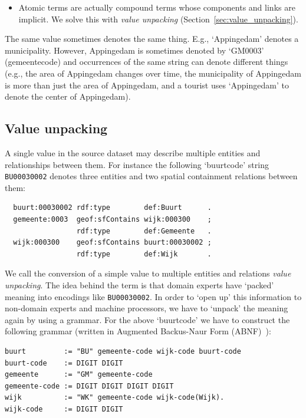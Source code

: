\documentclass[a4paper]{scrartcl}
\newcommand{\textt}[1]{{\small \texttt{#1}}}
\begin{document}
\begin{itemize}
  \item Atomic terms are actually compound terms whose components and
    links are implicit.  We solve this with \emph{value unpacking}
    (Section~\ref{sec:value_unpacking}).
\end{itemize}

The same value sometimes denotes the same thing.  E.g., `Appingedam'
denotes a municipality.  However, Appingedam is sometimes denoted by
`GM0003' (gemeentecode) and occurrences of the same string can denote
different things (e.g., the area of Appingedam changes over time, the
municipality of Appingedam is more than just the area of Appingedam,
and a tourist uses `Appingedam' to denote the center of Appingedam).



\subsection{Value unpacking}
\label{sec:grammar}
\label{sec:value_unpacking}

A single value in the source dataset may describe multiple entities
and relationships between them.  For instance the following
`buurtcode' string \textt{BU00030002} denotes three entities and two
spatial containment relations between them:

\begin{verbatim}
  buurt:00030002 rdf:type        def:Buurt      .
  gemeente:0003  geof:sfContains wijk:000300    ;
                 rdf:type        def:Gemeente   .
  wijk:000300    geof:sfContains buurt:00030002 ;
                 rdf:type        def:Wijk       .
\end{verbatim}

We call the conversion of a simple value to multiple entities and
relations \emph{value unpacking}.  The idea behind the term is that
domain experts have `packed' meaning into encodings like
\texttt{BU00030002}.  In order to `open up' this information to
non-domain experts and machine processors, we have to `unpack' the
meaning again by using a grammar.  For the above `buurtcode' we have
to construct the following grammar (written in Augmented Backus-Naur
Form (ABNF)~\cite{Crocker2008}):

\begin{verbatim}
buurt         := "BU" gemeente-code wijk-code buurt-code
buurt-code    := DIGIT DIGIT
gemeente      := "GM" gemeente-code
gemeente-code := DIGIT DIGIT DIGIT DIGIT
wijk          := "WK" gemeente-code wijk-code(Wijk).
wijk-code     := DIGIT DIGIT
\end{verbatim}
\end{document}
